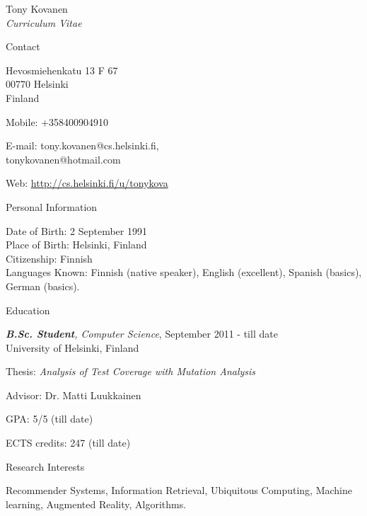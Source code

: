 \documentclass[10pt]{article}
\newenvironment{sublist}{%
	\begin{list}{}{%
		\setlength{\itemsep}{0em}\setlength{\parsep}{0em}%
		\setlength{\topsep}{0em}\setlength{\parskip}{0em}%
	}%
}%
{ \end{list} }
\begin{document}
\begin{cv}{Tony Kovanen\\{\large \itshape Curriculum Vitae}}

\begin{cvlist}{Contact}
	\item
	Hevosmiehenkatu 13 F 67\\
	00770 Helsinki\\
	Finland
	\item Mobile: +358400904910
	\item E-mail: tony.kovanen@cs.helsinki.fi,\\
	\hspace{10mm}tonykovanen@hotmail.com
	\item  Web: \url{http://cs.helsinki.fi/u/tonykova}
\end{cvlist}


\begin{cvlist}{Personal Information}
	\item Date of Birth: 2 September 1991\\
		Place of Birth: Helsinki, Finland\\
		Citizenship: Finnish\\
        Languages Known: Finnish (native speaker), English (excellent), Spanish (basics), German (basics).
\end{cvlist}

\begin{cvlist}{Education}
	\item \emph{{\bf B.Sc. Student}, Computer Science}, September 2011 - till date\\
	University of Helsinki, Finland
	\begin{sublist}
		\item Thesis: \textit{Analysis of Test Coverage with Mutation Analysis}
		\item Advisor: Dr. Matti Luukkainen
        \item GPA: 5/5 (till date)
        \item ECTS credits: 247 (till date)
	\end{sublist}
\end{cvlist}

\begin{cvlist}{Research Interests}
	\item Recommender Systems, Information Retrieval, Ubiquitous Computing, Machine learning, Augmented Reality, Algorithms.


\end{cvlist}
\end{cv}
\end{document}

